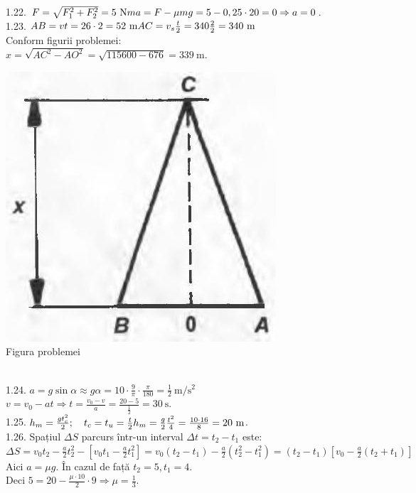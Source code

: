 1.22. $F=\sqrt{F_{1}^{2}+F_{2}^{2}}=5 \mathrm{~N}\\ m a=F-\mu m g=5-0,25 \cdot 20=0 \Rightarrow a=0$.\\

1.23. $A B=v t=26 \cdot 2=52 \mathrm{~m}\\ A C=v_{s} \frac{t}{2}=340 \frac{2}{2}=340 \mathrm{~m}$\\ Conform figurii problemei:\\ $x=\sqrt{A C^{2}-A O^{2}}=\sqrt{115600-676}=339 \mathrm{~m}$.\\ \begin{center} \includegraphics[width=0.4\linewidth]{images/2025_07_01_5b3ff9fa0d508c8e9f17g-202}\\ Figura problemei \end{center}\\

1.24. $a=g \sin \alpha \approx g \alpha=10 \cdot \frac{9}{\pi} \cdot \frac{\pi}{180}=\frac{1}{2} \mathrm{~m} / \mathrm{s}^{2}$\\ $v=v_{0}-a t \Rightarrow t=\frac{v_{0}-v}{a}=\frac{20-5}{\frac{1}{2}}=30 \mathrm{~s}$.\\

1.25. $h_{m}=\frac{g t_{c}^{2}}{2}; \quad t_{c}=t_{u}=\frac{t}{2}\\ h_{m}=\frac{g}{2} \frac{t^{2}}{4}=\frac{10 \cdot 16}{8}=20 \mathrm{~m}$.\\

1.26. Spațiul $\Delta S$ parcurs într-un interval $\Delta t=t_{2}-t_{1}$ este:\\ $\Delta S =v_{0} t_{2}-\frac{a}{2} t_{2}^{2}-\left[v_{0} t_{1}-\frac{a}{2} t_{1}^{2}\right]=v_{0}\left(t_{2}-t_{1}\right)-\frac{a}{2}\left(t_{2}^{2}-t_{1}^{2}\right)=\left(t_{2}-t_{1}\right)\left[v_{0}-\frac{a}{2}\left(t_{2}+t_{1}\right)\right]$\\ Aici $a=\mu g$. În cazul de față $t_{2}=5, t_{1}=4$.\\ Deci $5=20-\frac{\mu \cdot 10}{2} \cdot 9 \Rightarrow \mu=\frac{1}{3}$.\\

